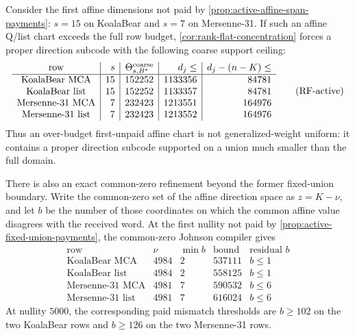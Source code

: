 \documentclass[11pt,a4paper]{amsart}
\numberwithin{equation}{section}
\theoremstyle{remark}
\begin{document}
\begin{proposition}
\label{prop:active-rank-flat-common-zero}
Consider the first affine dimensions not paid by
\cref{prop:active-affine-span-payments}: \(s=15\) on KoalaBear and
\(s=7\) on Mersenne-31.  If such an affine Q/list chart exceeds the full
row budget, \cref{cor:rank-flat-concentration} forces a proper direction
subcode with the following coarse support ceiling:
\[
\begin{array}{c|r|r|r|r}
\text{row}&s&\Theta^{\rm coarse}_{s,B^*}&d_j\le&d_j-(n-K)\le\\ \hline
\text{KoalaBear MCA}&15&152252&1133356&84781\\
\text{KoalaBear list}&15&152252&1133357&84781\\
\text{Mersenne-31 MCA}&7&232423&1213551&164976\\
\text{Mersenne-31 list}&7&232423&1213552&164976
\end{array}
\tag{RF-active}\label{eq:active-rank-flat}
\]
Thus an over-budget first-unpaid affine chart is not generalized-weight
uniform: it contains a proper direction subcode supported on a union much
smaller than the full domain.

There is also an exact common-zero refinement beyond the former
fixed-union boundary.  Write the common-zero set of the affine direction
space as \(z=K-\nu\), and let \(b\) be the number of those coordinates on
which the common affine value disagrees with the received word.  At the
first nullity not paid by \cref{prop:active-fixed-union-payments}, the
common-zero Johnson compiler gives
\[
\begin{array}{c|r|r|r|c}
\text{row}&\nu&\min b&\text{bound}&\text{residual }b\\ \hline
\text{KoalaBear MCA}&4984&2&537111&b\le1\\
\text{KoalaBear list}&4984&2&558125&b\le1\\
\text{Mersenne-31 MCA}&4981&7&590532&b\le6\\
\text{Mersenne-31 list}&4981&7&616024&b\le6
\end{array}
\tag{CZ-active}\label{eq:active-common-zero}
\]
At nullity \(5000\), the corresponding paid mismatch thresholds are
\(b\ge102\) on the two KoalaBear rows and \(b\ge126\) on the two
Mersenne-31 rows.
\end{proposition}
\end{document}
